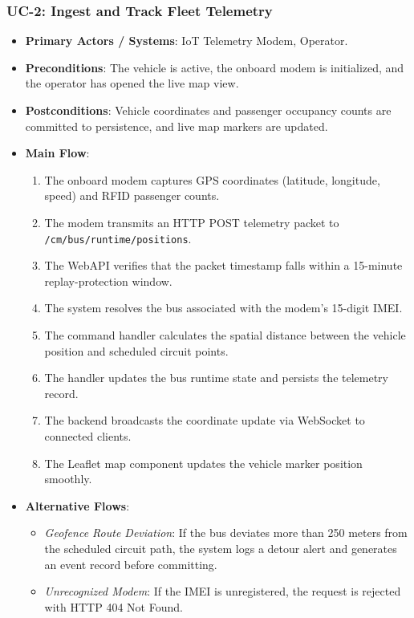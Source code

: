 \subsubsection{UC-2: Ingest and Track Fleet Telemetry}
\begin{itemize}
  \item \textbf{Primary Actors / Systems}: IoT Telemetry Modem, Operator.
  \item \textbf{Preconditions}: The vehicle is active, the onboard modem is initialized, and the operator has opened the live map view.
  \item \textbf{Postconditions}: Vehicle coordinates and passenger occupancy counts are committed to persistence, and live map markers are updated.
  \item \textbf{Main Flow}:
  \begin{enumerate}
    \item The onboard modem captures GPS coordinates (latitude, longitude, speed) and RFID passenger counts.
    \item The modem transmits an HTTP POST telemetry packet to \texttt{/cm/bus/runtime/positions}.
    \item The WebAPI verifies that the packet timestamp falls within a 15-minute replay-protection window.
    \item The system resolves the bus associated with the modem's 15-digit IMEI.
    \item The command handler calculates the spatial distance between the vehicle position and scheduled circuit points.
    \item The handler updates the bus runtime state and persists the telemetry record.
    \item The backend broadcasts the coordinate update via WebSocket to connected clients.
    \item The Leaflet map component updates the vehicle marker position smoothly.
  \end{enumerate}
  \item \textbf{Alternative Flows}:
  \begin{itemize}
    \item \emph{Geofence Route Deviation}: If the bus deviates more than 250 meters from the scheduled circuit path, the system logs a detour alert and generates an event record before committing.
    \item \emph{Unrecognized Modem}: If the IMEI is unregistered, the request is rejected with HTTP 404 Not Found.
  \end{itemize}
\end{itemize}

